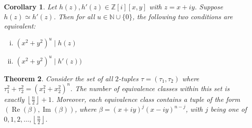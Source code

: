\documentclass[12pt,table]{article}
\newtheorem{theorem}{Theorem}[section]
\newtheorem{corollary}[theorem]{Corollary}
\theoremstyle{definition}
\theoremstyle{remark}
\newcommand{\Nnn}{\mathbb N}
\newcommand{\Zzz}{\mathbb Z}
\newcommand{\divides}{\mid}
\numberwithin{equation}{section}
\DeclareMathOperator{\Imag}{Im}
\DeclareMathOperator{\Real}{Re}
\begin{document}
\begin{corollary}
\label{corollary_equivalence}
Let $ h(z), h'(z) \in \Zzz[i][x,y] $ with $ z = x+ iy $.
Suppose $ h(z) \simeq h'(z) $. Then for all  $ u \in \Nnn \cup \{ 0 \} $,
the following two conditions are
equivalent:
\begin{enumerate}[i.]
\item $ ( x^2 + y^2 ) ^ u \divides h(z) $
\item $ ( x^2 + y^2 ) ^ u \divides h'(z)  ) $
\end{enumerate}
\end{corollary}



\begin{theorem}
\label{thm:2D_equivalence}
Consider the set of all $2$-tuples $ \tau = ( \tau_1, \tau_2 )$ where 
$
  \tau_1 ^ 2   +   \tau_2 ^ 2   
= 
\left(  x_1 ^ 2 + x_2 ^ 2  \right) ^ n 
$.
The number of equivalence classes within this set 
is exactly  $ \left\lfloor \frac{n}{2} \right\rfloor + 1 $. 
Moreover, each equivalence class contains a tuple
of the form $ ( \Real( \beta ) , \Imag( \beta ) ) $,
where $ \beta = (x + iy)^j (x -  iy)^{n-j} $,
with $ j $
being one of $ 0, 1, 2, \ldots, \left\lfloor \frac{n}{2} \right\rfloor $.
\end{theorem}
\end{document}
